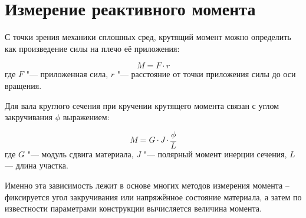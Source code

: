 \section{Измерение реактивного момента}


С точки зрения механики сплошных сред, крутящий момент можно определить как произведение силы на плечо её приложения:

\begin{equation}
	\label{eq:eq_Torque}
	M=F \cdot r
\end{equation}
где \(F\) "--- приложенная сила, \(r\) "--- расстояние от точки приложения силы до оси вращения.

Для вала круглого сечения при кручении крутящего момента связан с углом закручивания $\phi$ выражением:

\begin{equation}
	\label{eq:eq_torque}
	M=G\cdot J \cdot \frac{\phi}{L}
\end{equation}
где \(G\) "--- модуль сдвига материала, \(J\) "--- полярный момент инерции сечения, \(L\) --- длина участка.

Именно эта зависимость лежит в основе многих методов измерения момента -- фиксируется угол закручивания или напряжённое состояние материала, а затем по известности параметрами конструкции вычисляется величина момента.

